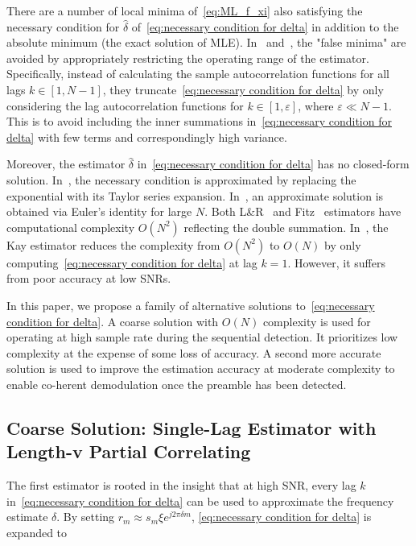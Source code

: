There are a number of local minima of~\eqref{eq:ML_f_xi} also satisfying
the necessary condition for $\hat{\delta}$ of~\eqref{eq:necessary condition for delta} in addition to the absolute minimum
(the exact solution of MLE). In~\cite{Luise_Reggiannini_95} and~\cite{Fitz_94}, the "false minima" are avoided
by appropriately restricting the operating range of the estimator. Specifically,
instead of calculating the sample autocorrelation functions for all lags $k\in[1,N-1]$, 
they truncate~\eqref{eq:necessary condition for delta} by only considering the lag autocorrelation functions for $k{\in}[1,\varepsilon]$,
where $\varepsilon \ll N{-}1$. This is to avoid 
including the inner summations in~\eqref{eq:necessary condition for delta} with few
terms and correspondingly high variance.

Moreover, the estimator $\hat{\delta}$ in~\eqref{eq:necessary condition for delta} has no closed-form solution.
In~\cite{Luise_Reggiannini_95}, the necessary condition is approximated by replacing the exponential with its Taylor series expansion.
In~\cite{Fitz_94}, an approximate solution is obtained via Euler's identity for large $N$.
Both L\&R~\cite{Luise_Reggiannini_95} and Fitz~\cite{Fitz_94} estimators have computational complexity $O(N^2)$ 
reflecting the double summation. In~\cite{kay_89}, the Kay estimator reduces the complexity from $O(N^2)$ to $O(N)$ by only computing~\eqref{eq:necessary condition for delta} at lag $k=1$.
However, it suffers from poor accuracy at low SNRs.

In this paper, we propose a family of alternative solutions to~\eqref{eq:necessary condition for delta}.
A coarse solution with $O(N)$ complexity is used for operating at high sample rate during the sequential detection.
It prioritizes low complexity at the expense of some loss of accuracy. A second more accurate solution is used to improve
the estimation accuracy at moderate complexity to enable co-herent demodulation once the preamble has been detected. 

\subsection{Coarse Solution: Single-Lag Estimator with Length-v Partial Correlating}

The first estimator is rooted in the insight that at high SNR, every lag $k$ in~\eqref{eq:necessary condition for delta}
can be used to approximate the frequency estimate $\delta$. By setting $r_m\approx s_m\xi e^{j2\pi\delta m}$,
\eqref{eq:necessary condition for delta} is expanded to

